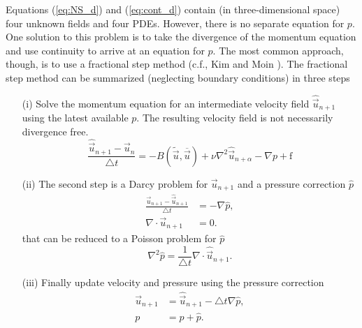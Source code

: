 Equations (\ref{eq:NS_d}) and (\ref{eq:cont_d}) contain (in three-dimensional space) four unknown fields and four PDEs. However, there is no separate equation for $p$. One solution to this problem is to take the divergence of the momentum equation and use continuity to arrive at an equation for $p$. The most common approach, though, is to use a fractional step method (c.f., Kim and Moin \cite{kim85}). The fractional step method can be summarized (neglecting boundary conditions) in three steps
\begin{itemize}
 \item[(i)] Solve the momentum equation for an intermediate velocity field $\hat{\vec{u}}_{n+1}$ using the latest available $p$. The resulting velocity field is not necessarily divergence free.\\
\begin{equation} 
\label{eq:NS_FS} \frac{\hat{\vec{u}}_{n+1}-\vec{u}_{n}}{\triangle t} = - B(\tilde{\vec{u}},\overline{\vec{u}}) + \nu \nabla^2 \hat{\vec{u}}_{n+\alpha} -\nabla p + \text{f}
\end{equation}
 \item[(ii)] The second step is a Darcy problem for $\vec{u}_{n+1}$ and a pressure correction $\hat{p}$ 
\begin{align}
 \label{eq:vel_Darcy} \frac{\vec{u}_{n+1} - \hat{\vec{u}}_{n+1}}{\triangle t} &=  - \nabla \hat{p}, \\
  \nabla \cdot \vec{u}_{n+1} &= 0.
\label{eq:update}
\end{align}
that can be reduced to a Poisson problem for $\hat{p}$
\begin{equation}
 \label{eq:PC} \nabla^2 \hat{p} = \frac{1}{\triangle t} \nabla \cdot \hat{\vec{u}}_{n+1}.
\end{equation}
 \item[(iii)] Finally update velocity and pressure using the pressure correction
\begin{align}
 \label{eq:vel_update} \vec{u}_{n+1} &= \hat{\vec{u}}_{n+1} - \triangle t \nabla \hat{p}, \\
  p &= p + \hat{p}.
\label{eq:update}
\end{align}
\end{itemize}

